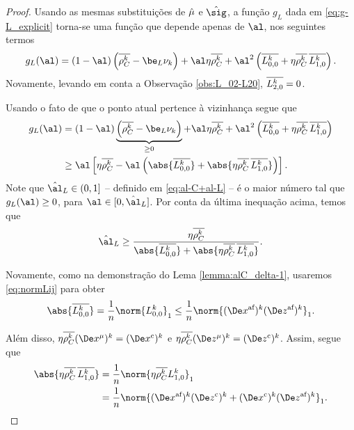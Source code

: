 \begin{proof}

Usando as mesmas substituições de $\hat{\mu}$ e $\nextsig$, a função $g_L$ dada em \eqref{eq:g-L_explicit} torna-se uma função que depende apenas de $\al$, nos seguintes termos 
\[
g_L(\al) =     (1-\al)\left(\rhoCkb  -  \be_L \nuk    \right) +  \al\eta\rhoCkb  + 
   \al^2\left( \dbvec{L_{0,0}^{k}} + \eta\rhoCkb   \,\dbvec{L_{1,0}^{k}}   \right ) .
	\]
Novamente,  levando em conta a Observação \ref{obs:L_02-L20}, 
$\overline{L_{2,0}^{k}} = 0$.

Usando  o fato de que o ponto atual pertence à  vizinhança segue que 
 \[
\begin{aligned}
{g}_L(\al) & =     (1-\al)\underbrace{\left(\rhoCkb  -  \be_L \nuk    \right)}_{\geq 0} +  \al\eta\rhoCkb  + 
   \al^2\left( \dbvec{L_{0,0}^{k}} + \eta\rhoCkb  \, \dbvec{L_{1,0}^{k}}   \right ) \\
   & \geq  \al\left[\eta\rhoCkb  - 
   \al \left(\abs{\dbvec{L_{0,0}^{k}}} + \abs{\eta\rhoCkb\,  \dbvec{L_{1,0}^{k}}}\right)   \right ].
\end{aligned}
 \]
Note que  $\nextal_L\in(0,1]$ -- definido em \eqref{eq:al-C+al-L} -- é o maior número tal que  $g_L(\al)\geq 0$, para  $\al\in[0,\nextal_L]$. Por conta da última inequação acima, temos que 
\begin{equation}
	\label{eq:next-al-ineq}
\nextal_L \geq \frac{\eta\rhoCkb  }{\abs{\dbvec{L_{0,0}^{k}}} + \abs{\eta\rhoCkb \,  \dbvec{L_{1,0}^{k}}}}.
\end{equation}

Novamente, como na demonstração do Lema \ref{lemma:alC_delta-1}, usaremos \eqref{eq:normLij} para obter
\begin{equation}
\abs{\dbvec{L_{0,0}^{k}}}  = \frac{1}{n}\norm{L_{0,0}^{k}}_{1}  \leq \dfrac{1}{n} \norm{ \dekx  \dekz }_1 .  \label{eq:bound-zeta}
\end{equation}

Além disso,  $\eta\rhoCkb (\Dex^\mu)^{k} = \Dekcox $  e $  \eta\rhoCkb (\Dez^\mu)^{k} = \Dekcoz$.
Assim,  segue que
	\begin{align}
	\abs{\eta\rhoCkb \,  \dbvec{L_{1,0}^{k}}} & = \dfrac{1}{n}\norm{\eta\rhoCkb L_{1,0}^{k}}_{1}  \notag \\
	& =  \dfrac{1}{n} \norm{ \dekx \Dekcoz + \Dekcox \dekz }_1.\label{eq:bound-chi}
	\end{align}



\end{proof}
